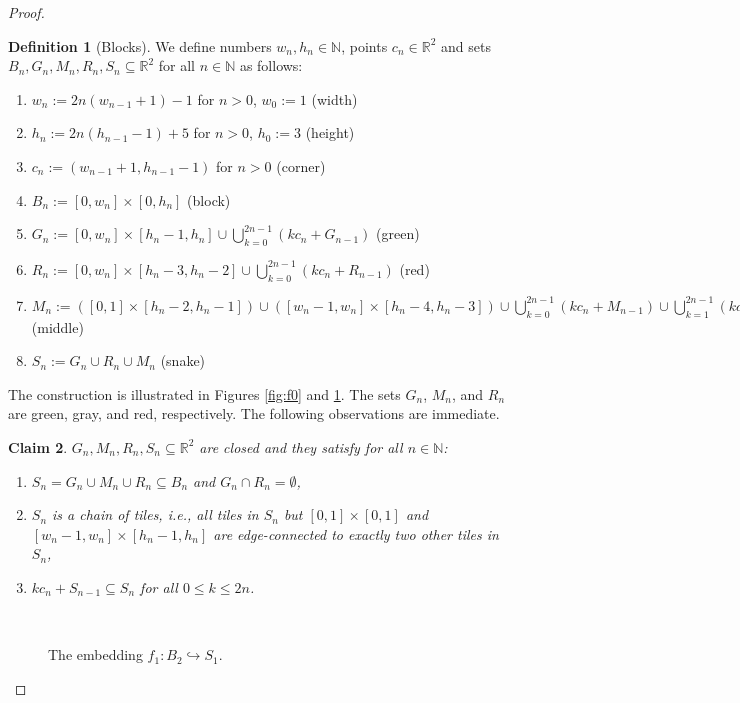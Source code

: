 \documentclass[a4paper]{amsart}
\def\IN{{\mathbb{N}}}
\def\IR{{\mathbb{R}}}
\def\In{\subseteq}
\def\into{\hookrightarrow}
\newtheorem{localclaim}{Claim}[theorem]
\theoremstyle{definition}
\newtheorem{localdef}[localclaim]{Definition}
\begin{document}
\begin{proof}
\begin{localdef}[Blocks]
We define numbers $w_n,h_n\in\IN$, points $c_n\in\IR^2$ and
sets $B_n,G_n, M_n, R_n,S_n \subseteq\IR^2$ for all $n\in\IN$ as follows:
\begin{enumerate}
\item $w_n := 2n(w_{n-1} + 1) - 1$ for $n>0$, $w_0 := 1$ \hfill (width)
\item $h_{n} := 2n(h_{n-1}-1) + 5$  for $n>0$, $h_0 := 3$ \hfill (height)
\item $c_n := (w_{n-1}+1,h_{n-1}-1)$ for $n>0$ \hfill (corner)
\item $B_n := [0, w_n] \times [0,h_n]$ \hfill (block)
\item $G_{n} := [0,w_n] \times [h_n-1,h_n] \cup \bigcup_{k=0}^{2n-1} (kc_n+G_{n-1} )$  \hfill (green)
\item $R_{n} := [0,w_n] \times [h_n-3,h_n-2] \cup \bigcup_{k=0}^{2n-1} (kc_n + R_{n-1})$  \hfill (red)
\item $M_{n}  := ([0,1] \times [h_n-2, h_n-1]) \cup ([w_n-1,w_n] \times [h_n-4, h_n-3])\cup \bigcup_{k=0}^{2n-1}  \left( kc_n + M_{n-1} \right) \cup  \bigcup_{k=1}^{2n-1} \left(kc_n + ([- 1,0] \times [0,1]) \right)$ \hfill (middle)
\item $S_n := G_n \cup R_n \cup M_n$ \hfill (snake)
\end{enumerate}
\end{localdef}

The construction is illustrated in Figures \ref{fig:f0} and \ref{fig:f1}. The sets $G_n$, $M_n$, and $R_n$ are green, gray, and red, respectively.
The following observations are immediate.

\begin{localclaim}
\label{claim:dim2-2}
$G_n,M_n,R_n,S_n\In\IR^2$ are closed and they satisfy for all $n\in\IN$:
\begin{enumerate}
\item $S_n=G_n\cup M_n\cup R_n\In B_n$ and $G_n\cap R_n=\emptyset$,
\item $S_n$ is a chain of tiles, i.e., all tiles in $S_n$ but $[0,1] \times [0,1]$ and $[w_n-1,w_n] \times [h_n-1,h_n]$ are edge-connected to exactly two other tiles in $S_n$,
\item $kc_n + S_{n-1} \subseteq S_n$ for all $0 \leq k \leq 2n$.
\end{enumerate}
\end{localclaim}

\begin{figure}[htb]
\begin{tiny}
\hspace*{-1cm}
\end{tiny}
\ \\[-0.6cm]
\caption{The embedding $f_1:B_2\into S_1$.}
\label{fig:f1}
\end{figure}


\end{proof}
\end{document}
